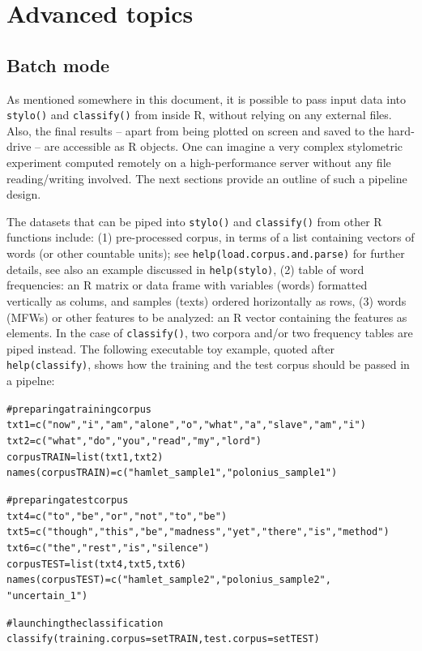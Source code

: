 \documentclass[11pt,a4paper]{article}
\def\code#1{{\tt #1}}
\begin{document}
\section{Advanced topics}





\subsection{Batch mode}

As mentioned somewhere in this document, it is possible to pass input data into \code{stylo()} and \code{classify()} from inside R, without relying on any external files. Also, the final results -- apart from being plotted on screen and saved to the hard-drive -- are accessible as R objects. One can imagine a very complex stylometric experiment computed remotely on a high-performance server without any file reading/writing involved. The next sections provide an outline of such a pipeline design.

The datasets that can be piped into \code{stylo()} and \code{classify()} from other R functions include: (1) pre-processed corpus, in terms of a list containing vectors of words (or other countable units); see \code{help(load.corpus.and.parse)} for further details, see also an example discussed in \code{help(stylo)}, (2) table of word frequencies: an R matrix or data frame with variables (words) formatted vertically as colums, and samples (texts) ordered horizontally as rows, (3) words (MFWs) or other features to be analyzed: an R vector containing the features as elements. In the case of \code{classify()}, two corpora and/or two frequency tables are piped instead. The following executable toy example, quoted after \code{help(classify)}, shows how the training and the test corpus should be passed in a pipelne:

\begin{alltt}
     # preparing a training corpus
     txt1 = c("now", "i", "am", "alone", "o", "what", "a", "slave", "am", "i")
     txt2 = c("what", "do", "you", "read", "my", "lord")
     corpusTRAIN = list(txt1, txt2)
     names(corpusTRAIN) = c("hamlet_sample1", "polonius_sample1")

     # preparing a test corpus
     txt4 = c("to", "be", "or", "not", "to", "be")
     txt5 = c("though", "this", "be", "madness", "yet", "there", "is", "method")
     txt6 = c("the", "rest", "is", "silence")
     corpusTEST = list(txt4, txt5, txt6)
     names(corpusTEST) = c("hamlet_sample2", "polonius_sample2", 
              "uncertain_1")

     # launching the classification
     classify(training.corpus = setTRAIN, test.corpus = setTEST)
\end{alltt}
\end{document}

